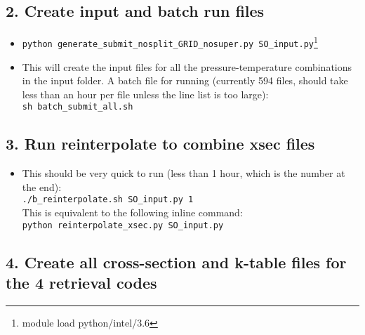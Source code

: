 \documentclass{article}
\begin{document}
\subsection*{2. Create input and batch run files}

\begin{itemize}
\item \verb|python generate_submit_nosplit_GRID_nosuper.py SO_input.py|\footnote{module load python/intel/3.6}
\item This will create the input files for all the pressure-temperature combinations in the input folder. A batch file for running (currently 594 files, should take less than an hour per file unless the line list is too large): \\ \verb|sh batch_submit_all.sh| \\
\end{itemize}

\subsection*{3. Run reinterpolate to combine xsec files}

\begin{itemize}
\item This should be very quick to run (less than 1 hour, which is the number at the end): \\
\verb|./b_reinterpolate.sh SO_input.py 1| \\
This is equivalent to the following inline command:\\ 
\verb|python reinterpolate_xsec.py SO_input.py|
\end{itemize}   

\subsection*{4. Create all cross-section and k-table files for the 4 retrieval codes}
\end{document}
